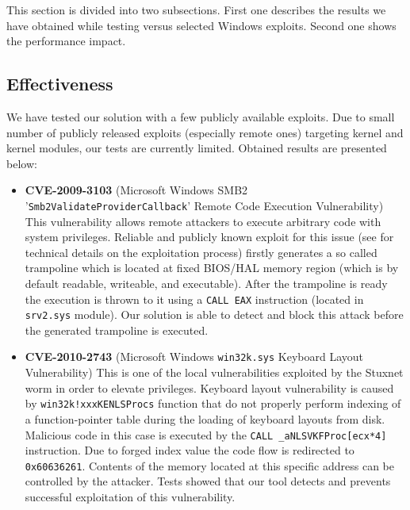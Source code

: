 \documentclass[10pt,twocolumn,a4paper]{article}
\begin{document}
This section is divided into two subsections. First one describes the results we have obtained while testing versus selected Windows exploits. Second one shows the performance impact.

\subsection{Effectiveness}

We have tested our solution with a few publicly available exploits. Due to small number of publicly released exploits (especially remote ones) targeting kernel and kernel modules, our tests are currently limited. Obtained results are presented below:

\begin{itemize}
    \item {\textbf{CVE-2009-3103}} (Microsoft Windows SMB2 '{\tt{Smb2ValidateProviderCallback}}' Remote Code Execution Vulnerability) \cite{SMB2CVE, SMB2Exploit} \newline
{\newline\noindent}This vulnerability allows remote attackers to execute arbitrary code with system privileges. Reliable and publicly known exploit for this issue (see \cite{SMB2Exploit} for technical details on the exploitation process) firstly generates a so called trampoline which is located at fixed BIOS/HAL memory region (which is by default readable, writeable, and executable). After the trampoline is ready the execution is thrown to it using a {\tt{CALL EAX}} instruction (located in {\tt{srv2.sys}} module). Our solution is able to detect and block this attack before the generated trampoline is executed.

    \item {\textbf{CVE-2010-2743}} (Microsoft Windows {\tt{win32k.sys}} Keyboard Layout Vulnerability) \cite{StuxnetCVE, StuxnetVUPEN, StuxnetRUBEN} \newline
{\newline\noindent}This is one of the local vulnerabilities exploited by the Stuxnet worm \cite{StuxnetWIKI} in order to elevate privileges. Keyboard layout vulnerability is caused by {\tt{win32k!xxxKENLSProcs}} function that do not properly perform indexing of a function-pointer table during the loading of keyboard layouts from disk. Malicious code in this case is executed by the {\tt{CALL \_aNLSVKFProc[ecx*4]}} instruction. Due to forged index value the code flow is redirected to {\tt{0x60636261}}. Contents of the memory located at this specific address can be controlled by the attacker. Tests showed that our tool detects and prevents successful exploitation of this vulnerability.
\end{itemize}
\end{document}
